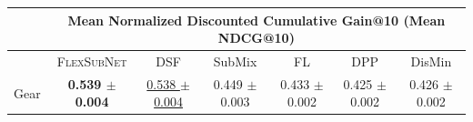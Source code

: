 \documentclass{article}
\newcommand{\our}{\textsc{Flex\-Sub\-Net}}
\renewcommand{\sec}{\underline}
\begin{document}
\begin{table}[h]
{\begin{tabular}{p{1.1cm}||c|ccccc}
\hline\hline
& \multicolumn{6}{c}{\textbf{Mean Normalized Discounted Cumulative Gain@10 (Mean NDCG@10)}}   \\ \hline
&\our  & DSF & SubMix & FL  & DPP & DisMin   \\ \hline\hline









Gear &  \textbf{ 0.539  $\pm$  0.004 } &  \sec{ 0.538  $\pm$  0.004 } &   0.449  $\pm$  0.003 &   0.433  $\pm$  0.002 &   0.425  $\pm$  0.002 &   0.426  $\pm$  0.002 \\ 


\end{tabular}}
\end{table}
\end{document}
